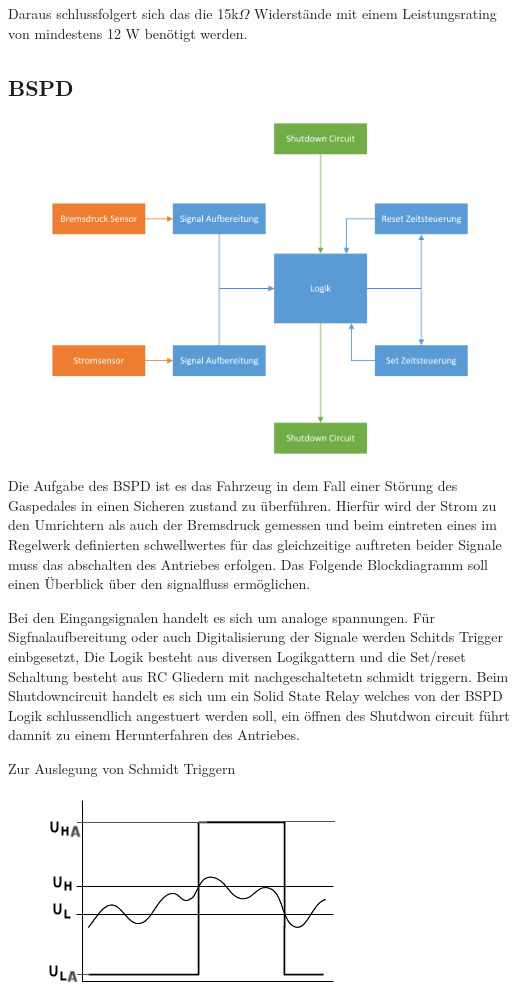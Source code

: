 Daraus schlussfolgert sich das die 15k$\Omega$ Widerstände mit einem Leistungsrating von mindestens 12 W benötigt werden.

\FloatBarrier
\subsection{BSPD}

\begin{figure}
	\centering
	\includegraphics[width=0.7\linewidth]{"bilder/BSPD Blockdiagramm"}
	\caption{}
	\label{fig:bspd-blockdiagramm}
\end{figure}

Die Aufgabe des BSPD ist es das Fahrzeug in dem Fall einer Störung des Gaspedales in einen Sicheren zustand zu überführen. Hierfür wird der Strom zu den Umrichtern als auch der Bremsdruck gemessen und beim eintreten eines im Regelwerk definierten schwellwertes für das gleichzeitige auftreten beider Signale muss das abschalten des Antriebes erfolgen. Das Folgende Blockdiagramm soll einen Überblick über den signalfluss ermöglichen.

Bei den Eingangsignalen handelt es sich um analoge spannungen. Für Sigfnalaufbereitung oder auch Digitalisierung der Signale werden Schitds Trigger einbgesetzt, Die Logik besteht aus diversen Logikgattern und die Set/reset Schaltung besteht aus RC Gliedern mit nachgeschaltetetn schmidt triggern. Beim Shutdowncircuit handelt es sich um ein Solid State Relay welches von der BSPD Logik schlussendlich angestuert werden soll, ein öffnen des Shutdwon circuit führt damnit zu einem Herunterfahren des Antriebes.

Zur Auslegung von Schmidt Triggern
\begin{figure}
	\centering
	\includegraphics[width=0.5\linewidth]{bilder/Schmitt-trigger-diagramm.png}
	\caption{}
	\label{fig:schmitt-trigger-diagramm}
\end{figure}

